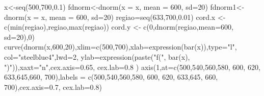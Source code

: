 \documentclass[
  letterpaper,
  DIV=11,
  numbers=noendperiod]{scrartcl}
\newenvironment{Shaded}{\begin{snugshade}}{\end{snugshade}}
\newcommand{\AttributeTok}[1]{\textcolor[rgb]{0.40,0.45,0.13}{#1}}
\newcommand{\DecValTok}[1]{\textcolor[rgb]{0.68,0.00,0.00}{#1}}
\newcommand{\FloatTok}[1]{\textcolor[rgb]{0.68,0.00,0.00}{#1}}
\newcommand{\FunctionTok}[1]{\textcolor[rgb]{0.28,0.35,0.67}{#1}}
\newcommand{\NormalTok}[1]{\textcolor[rgb]{0.00,0.23,0.31}{#1}}
\newcommand{\OtherTok}[1]{\textcolor[rgb]{0.00,0.23,0.31}{#1}}
\newcommand{\StringTok}[1]{\textcolor[rgb]{0.13,0.47,0.30}{#1}}
\begin{document}
\begin{Shaded}
\begin{Highlighting}[]
\NormalTok{x}\OtherTok{\textless{}{-}}\FunctionTok{seq}\NormalTok{(}\DecValTok{500}\NormalTok{,}\DecValTok{700}\NormalTok{,}\FloatTok{0.1}\NormalTok{) }
\NormalTok{fdnorm}\OtherTok{\textless{}{-}}\FunctionTok{dnorm}\NormalTok{(}\AttributeTok{x =}\NormalTok{ x, }\AttributeTok{mean =} \DecValTok{600}\NormalTok{, }\AttributeTok{sd=}\DecValTok{20}\NormalTok{)  }
\NormalTok{fdnorm1}\OtherTok{\textless{}{-}}\FunctionTok{dnorm}\NormalTok{(}\AttributeTok{x =}\NormalTok{ x, }\AttributeTok{mean =} \DecValTok{600}\NormalTok{, }\AttributeTok{sd=}\DecValTok{20}\NormalTok{)}
\NormalTok{regiao}\OtherTok{=}\FunctionTok{seq}\NormalTok{(}\DecValTok{633}\NormalTok{,}\DecValTok{700}\NormalTok{,}\FloatTok{0.01}\NormalTok{)}
\NormalTok{cord.x }\OtherTok{\textless{}{-}} \FunctionTok{c}\NormalTok{(}\FunctionTok{min}\NormalTok{(regiao),regiao,}\FunctionTok{max}\NormalTok{(regiao))}
\NormalTok{cord.y }\OtherTok{\textless{}{-}} \FunctionTok{c}\NormalTok{(}\DecValTok{0}\NormalTok{,}\FunctionTok{dnorm}\NormalTok{(regiao,}\AttributeTok{mean=}\DecValTok{600}\NormalTok{, }\AttributeTok{sd=}\DecValTok{20}\NormalTok{),}\DecValTok{0}\NormalTok{) }
\FunctionTok{curve}\NormalTok{(}\FunctionTok{dnorm}\NormalTok{(x,}\DecValTok{600}\NormalTok{,}\DecValTok{20}\NormalTok{),}\AttributeTok{xlim=}\FunctionTok{c}\NormalTok{(}\DecValTok{500}\NormalTok{,}\DecValTok{700}\NormalTok{),}\AttributeTok{xlab=}\FunctionTok{expression}\NormalTok{(}\FunctionTok{bar}\NormalTok{(x)),}\AttributeTok{type=}\StringTok{"l"}\NormalTok{,}
      \AttributeTok{col=}\StringTok{"steelblue4"}\NormalTok{,}\AttributeTok{lwd=}\DecValTok{2}\NormalTok{, }\AttributeTok{ylab=}\FunctionTok{expression}\NormalTok{(}\FunctionTok{paste}\NormalTok{(}\StringTok{"f("}\NormalTok{, }\FunctionTok{bar}\NormalTok{(x),}
      \StringTok{")"}\NormalTok{)),}\AttributeTok{xaxt=}\StringTok{"n"}\NormalTok{,}\AttributeTok{cex.axis=}\FloatTok{0.65}\NormalTok{, }\AttributeTok{cex.lab=}\FloatTok{0.8}\NormalTok{ ) }
\FunctionTok{axis}\NormalTok{(}\DecValTok{1}\NormalTok{,}\AttributeTok{at=}\FunctionTok{c}\NormalTok{(}\DecValTok{500}\NormalTok{,}\DecValTok{540}\NormalTok{,}\DecValTok{560}\NormalTok{,}\DecValTok{580}\NormalTok{, }\DecValTok{600}\NormalTok{, }\DecValTok{620}\NormalTok{, }\DecValTok{633}\NormalTok{,}\DecValTok{645}\NormalTok{,}\DecValTok{660}\NormalTok{, }\DecValTok{700}\NormalTok{),}\AttributeTok{labels =}
       \FunctionTok{c}\NormalTok{(}\DecValTok{500}\NormalTok{,}\DecValTok{540}\NormalTok{,}\DecValTok{560}\NormalTok{,}\DecValTok{580}\NormalTok{, }\DecValTok{600}\NormalTok{, }\DecValTok{620}\NormalTok{, }\DecValTok{633}\NormalTok{,}\DecValTok{645}\NormalTok{, }\DecValTok{660}\NormalTok{, }\DecValTok{700}\NormalTok{),}\AttributeTok{cex.axis=}\FloatTok{0.7}\NormalTok{, }\AttributeTok{cex.lab=}\FloatTok{0.8}\NormalTok{) }

\end{Highlighting}
\end{Shaded}
\end{document}
